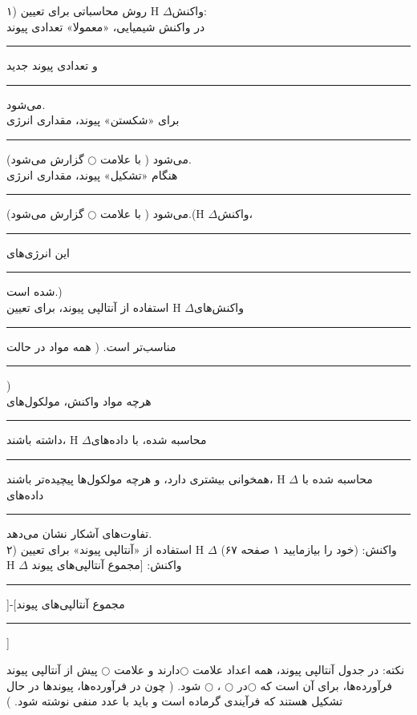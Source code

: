 \documentclass[a4paper,12pt]{article}
\newcommand{\ff}{\rule{1cm}{0.15mm}\;}
\newcommand{\fb}{\rule{2cm}{0.15mm}\;}
\begin{document}
۱) روش محاسباتی برای تعیین H $\Delta$واکنش:
\\
در واکنش شیمیایی، «معمولا» تعدادی پیوند \ff و تعدادی پیوند جدید \ff می‌شود.
\\
برای «شکستن» پیوند،‌ مقداری انرژی \ff می‌شود ( با علامت $\bigcirc$ گزارش می‌شود).
\\
هنگام «تشکیل» پیوند،‌ مقداری انرژی \ff می‌شود ( با علامت $\bigcirc$ گزارش می‌شود).(H $\Delta$واکنش، \ff این انرژی‌های \ff شده است.)
\\
استفاده از آنتالپی پیوند، برای تعیین H $\Delta$واکنش‌های \ff مناسب‌تر است. ( همه مواد در حالت \ff )
\\
هرچه مواد واکنش‌، مولکول‌های \ff داشته باشند، H $\Delta$محاسبه شده، با داده‌های \ff همخوانی بیشتری دارد، و هرچه مولکول‌ها پیچیده‌تر باشند، H $\Delta$ محاسبه شده با داده‌های \ff تفاوت‌های آشکار نشان می‌دهد.
\\
۲) استفاده از «آنتالپی پیوند» برای تعیین H $\Delta$ واکنش: (خود را بیازمایید ۱ صفحه ۶۷)
\\
H $\Delta$ واکنش: [مجموع آنتالپی‌های پیوند\fb]-[مجموع آنتالپی‌های پیوند\fb]

\newpage


نکته: در جدول آنتالپی پیوند، همه اعداد علامت 	$\bigcirc$دارند و علامت $\bigcirc$	پیش از آنتالپی پیوند فرآورده‌ها، برای آن است که 	$\bigcirc$در $\bigcirc$	، $\bigcirc$	شود. ( چون در فرآورده‌ها، پیوند‌ها در حال تشکیل هستند که فرآیندی گرماده است و باید با عدد منفی نوشته شود. )
\end{document}
